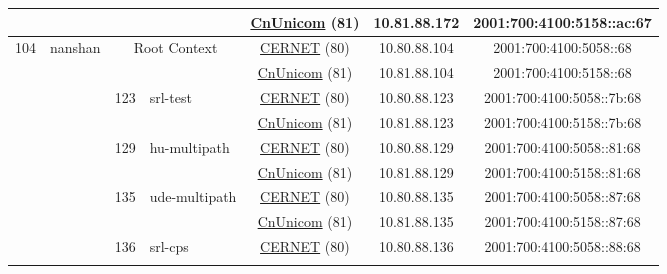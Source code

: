 \begin{small}
\begin{center}
\begin{longtable}{|c|c|c|c|c|c|c|c|}
  &  &  &  & \multicolumn{2}{|c|}{\tiny{\href{http://www.chinaunicom.com}{CnUnicom} (81)}} & \tiny{10.81.88.172} & \tiny{2001:700:4100:5158::ac:67} \\ \hline
 \multirow{28}{*}{\tiny{104}} & \multicolumn{1}{|l|}{\multirow{28}{*}{\tiny{nanshan}}} & \multicolumn{2}{|c|}{\multirow{2}{*}{\tiny{Root Context}}} & \multicolumn{2}{|c|}{\tiny{\href{http://www.cernet.edu.cn}{CERNET} (80)}} & \tiny{10.80.88.104} & \tiny{2001:700:4100:5058::68} \\* \cline{5-5}\cline{6-6}\cline{7-7}\cline{8-8}
  &  & \multicolumn{2}{|c|}{} & \multicolumn{2}{|c|}{\tiny{\href{http://www.chinaunicom.com}{CnUnicom} (81)}} & \tiny{10.81.88.104} & \tiny{2001:700:4100:5158::68} \\* \cline{3-3}\cline{4-4}\cline{5-5}\cline{6-6}\cline{7-7}\cline{8-8}
  &  & \multirow{2}{*}{\tiny{123}} & \multicolumn{1}{|l|}{\multirow{2}{*}{\tiny{srl-test}}} & \multicolumn{2}{|c|}{\tiny{\href{http://www.cernet.edu.cn}{CERNET} (80)}} & \tiny{10.80.88.123} & \tiny{2001:700:4100:5058::7b:68} \\* \cline{5-5}\cline{6-6}\cline{7-7}\cline{8-8}
  &  &  &  & \multicolumn{2}{|c|}{\tiny{\href{http://www.chinaunicom.com}{CnUnicom} (81)}} & \tiny{10.81.88.123} & \tiny{2001:700:4100:5158::7b:68} \\* \cline{3-3}\cline{4-4}\cline{5-5}\cline{6-6}\cline{7-7}\cline{8-8}
  &  & \multirow{2}{*}{\tiny{129}} & \multicolumn{1}{|l|}{\multirow{2}{*}{\tiny{hu-multipath}}} & \multicolumn{2}{|c|}{\tiny{\href{http://www.cernet.edu.cn}{CERNET} (80)}} & \tiny{10.80.88.129} & \tiny{2001:700:4100:5058::81:68} \\* \cline{5-5}\cline{6-6}\cline{7-7}\cline{8-8}
  &  &  &  & \multicolumn{2}{|c|}{\tiny{\href{http://www.chinaunicom.com}{CnUnicom} (81)}} & \tiny{10.81.88.129} & \tiny{2001:700:4100:5158::81:68} \\* \cline{3-3}\cline{4-4}\cline{5-5}\cline{6-6}\cline{7-7}\cline{8-8}
  &  & \multirow{2}{*}{\tiny{135}} & \multicolumn{1}{|l|}{\multirow{2}{*}{\tiny{ude-multipath}}} & \multicolumn{2}{|c|}{\tiny{\href{http://www.cernet.edu.cn}{CERNET} (80)}} & \tiny{10.80.88.135} & \tiny{2001:700:4100:5058::87:68} \\* \cline{5-5}\cline{6-6}\cline{7-7}\cline{8-8}
  &  &  &  & \multicolumn{2}{|c|}{\tiny{\href{http://www.chinaunicom.com}{CnUnicom} (81)}} & \tiny{10.81.88.135} & \tiny{2001:700:4100:5158::87:68} \\* \cline{3-3}\cline{4-4}\cline{5-5}\cline{6-6}\cline{7-7}\cline{8-8}
  &  & \multirow{2}{*}{\tiny{136}} & \multicolumn{1}{|l|}{\multirow{2}{*}{\tiny{srl-cps}}} & \multicolumn{2}{|c|}{\tiny{\href{http://www.cernet.edu.cn}{CERNET} (80)}} & \tiny{10.80.88.136} & \tiny{2001:700:4100:5058::88:68} \\* \cline{5-5}\cline{6-6}\cline{7-7}\cline{8-8}

\end{longtable}
\end{center}
\end{small}
